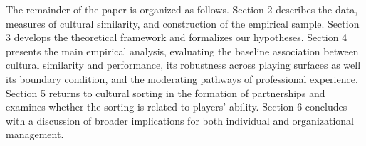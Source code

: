 \documentclass[10pt]{article}
\begin{document}



The remainder of the paper is organized as follows. Section 2 describes the data, measures of cultural similarity, and construction of the empirical sample. Section 3 develops the theoretical framework and formalizes our hypotheses. Section 4 presents the main empirical analysis,   evaluating the baseline association between cultural similarity and performance, its robustness across playing surfaces as well its  boundary condition, and the moderating pathways of professional experience. Section 5 returns to cultural sorting in the formation of partnerships and examines whether the sorting is related to players’ ability. Section 6 concludes with a discussion of broader implications for both individual and organizational management.
\end{document}

